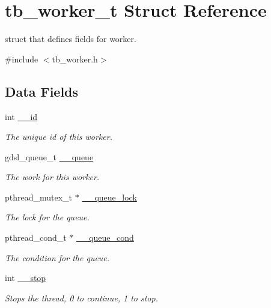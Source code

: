 \hypertarget{structtb__worker__t}{\section{tb\-\_\-worker\-\_\-t Struct Reference}
\label{structtb__worker__t}
}


struct that defines fields for worker.  




{\ttfamily \#include $<$tb\-\_\-worker.\-h$>$}

\subsection*{Data Fields}
\begin{DoxyCompactItemize}
\item 
int \hyperlink{structtb__worker__t_a4b75564f2d4bac6720918785d0de5034}{\-\_\-\-\_\-id}
\begin{DoxyCompactList}\small\item\em The unique id of this worker. \end{DoxyCompactList}\item 
gdsl\-\_\-queue\-\_\-t \hyperlink{structtb__worker__t_aea4c15677ebae0f50f9f4684804d7987}{\-\_\-\-\_\-queue}
\begin{DoxyCompactList}\small\item\em The work for this worker. \end{DoxyCompactList}\item 
pthread\-\_\-mutex\-\_\-t $\ast$ \hyperlink{structtb__worker__t_a0721617bd4bf8c42313acd1791f62885}{\-\_\-\-\_\-queue\-\_\-lock}
\begin{DoxyCompactList}\small\item\em The lock for the queue. \end{DoxyCompactList}\item 
pthread\-\_\-cond\-\_\-t $\ast$ \hyperlink{structtb__worker__t_a1302209e4d7c2a7707bfcd735ead74e0}{\-\_\-\-\_\-queue\-\_\-cond}
\begin{DoxyCompactList}\small\item\em The condition for the queue. \end{DoxyCompactList}\item 
int \hyperlink{structtb__worker__t_a3c8ddb573339a9677d54ba3e63387f1d}{\-\_\-\-\_\-stop}
\begin{DoxyCompactList}\small\item\em Stops the thread, 0 to continue, 1 to stop. \end{DoxyCompactList}\end{DoxyCompactItemize}


